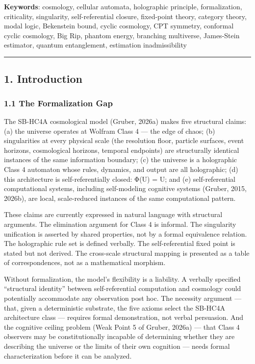 \documentclass[
]{article}
\begin{document}
\textbf{Keywords}: cosmology, cellular automata, holographic principle,
formalization, criticality, singularity, self-referential closure,
fixed-point theory, category theory, modal logic, Bekenstein bound,
cyclic cosmology, CPT symmetry, conformal cyclic cosmology, Big Rip,
phantom energy, branching multiverse, James-Stein estimator, quantum
entanglement, estimation inadmissibility

\begin{center}\rule{0.5\linewidth}{0.5pt}\end{center}

\hypertarget{introduction}{%
\subsection{1. Introduction}\label{introduction}}

\hypertarget{the-formalization-gap}{%
\subsubsection{1.1 The Formalization Gap}\label{the-formalization-gap}}

The SB-HC4A cosmological model (Gruber, 2026a) makes five structural
claims: (a) the universe operates at Wolfram Class 4 --- the edge of
chaos; (b) singularities at every physical scale (the resolution floor,
particle surfaces, event horizons, cosmological horizons, temporal
endpoints) are structurally identical instances of the same information
boundary; (c) the universe is a holographic Class 4 automaton whose
rules, dynamics, and output are all holographic; (d) this architecture
is self-referentially closed: Φ(U) = U; and (e) self-referential
computational systems, including self-modeling cognitive systems
(Gruber, 2015, 2026b), are local, scale-reduced instances of the same
computational pattern.

These claims are currently expressed in natural language with structural
arguments. The elimination argument for Class 4 is informal. The
singularity unification is asserted by shared properties, not by a
formal equivalence relation. The holographic rule set is defined
verbally. The self-referential fixed point is stated but not derived.
The cross-scale structural mapping is presented as a table of
correspondences, not as a mathematical morphism.

Without formalization, the model's flexibility is a liability. A
verbally specified ``structural identity'' between self-referential
computation and cosmology could potentially accommodate any observation
post hoc. The necessity argument --- that, given a deterministic
substrate, the five axioms select the SB-HC4A architecture class ---
requires formal demonstration, not verbal persuasion. And the cognitive
ceiling problem (Weak Point 5 of Gruber, 2026a) --- that Class 4
observers may be constitutionally incapable of determining whether they
are describing the universe or the limits of their own cognition ---
needs formal characterization before it can be analyzed.
\end{document}
